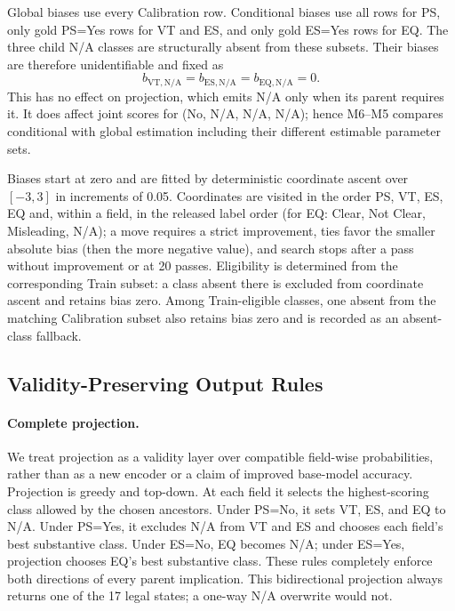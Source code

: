 Global biases use every Calibration row. Conditional biases use all rows for
PS, only gold PS=Yes rows for VT and ES, and only gold ES=Yes rows for EQ. The
three child N/A classes are structurally absent from these subsets. Their
biases are therefore unidentifiable and fixed as
\begin{equation}
  b_{\mathrm{VT},\mathrm{N/A}}=
  b_{\mathrm{ES},\mathrm{N/A}}=
  b_{\mathrm{EQ},\mathrm{N/A}}=0.
  \label{eq:pinned-biases}
\end{equation}
This has no effect on projection, which emits N/A only when its parent requires
it. It does affect joint scores for (No, N/A, N/A, N/A); hence M6--M5 compares
conditional with global estimation including their different estimable
parameter sets.

Biases start at zero and are fitted by deterministic coordinate ascent over
$[-3,3]$ in increments of 0.05. Coordinates are visited in the order PS, VT,
ES, EQ and, within a field, in the released label order (for EQ: Clear, Not
Clear, Misleading, N/A); a move requires a strict improvement, ties favor the
smaller absolute bias (then the more negative value), and search stops after a
pass without improvement or at 20 passes. Eligibility is determined from the corresponding
Train subset: a class absent there is excluded from coordinate ascent and
retains bias zero. Among Train-eligible classes, one absent from the matching
Calibration subset also retains bias zero and is recorded as an absent-class
fallback.

\subsection{Validity-Preserving Output Rules}
\paragraph{Complete projection.}
We treat projection as a validity layer over compatible field-wise
probabilities, rather than as a new encoder or a claim of improved base-model
accuracy. Projection is greedy and top-down. At each field it selects the highest-scoring
class allowed by the chosen ancestors. Under PS=No, it sets VT, ES, and EQ to
N/A. Under PS=Yes, it excludes N/A from VT and ES and chooses each field's best
substantive class. Under ES=No, EQ becomes N/A; under ES=Yes, projection chooses
EQ's best substantive class. These rules completely enforce both directions of
every parent implication. This bidirectional projection always returns one of
the 17 legal states; a one-way N/A overwrite would not.

